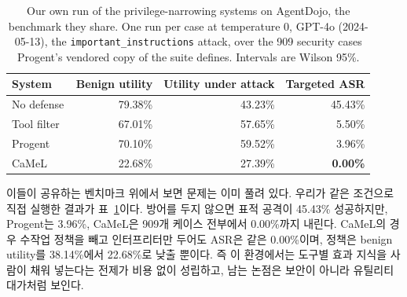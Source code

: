 \documentclass[acmsmall,screen,review,anonymous]{acmart}
\begin{document}
\begin{table}[h]
\caption{Our own run of the privilege-narrowing systems on AgentDojo, the benchmark they share. One run per case at temperature 0, GPT-4o (2024-05-13), the \texttt{important\_instructions} attack, over the 909 security cases Progent's vendored copy of the suite defines. Intervals are Wilson 95\%.}
\label{tab:adrun}
\small
\begin{tabular}{lrrr}
\toprule
System & Benign utility & Utility under attack & Targeted ASR \\
\midrule
No defense                      & 79.38\% & 43.23\% & 45.43\% \\
Tool filter~\cite{debenedetti2024agentdojo} & 67.01\% & 57.65\% & 5.50\% \\
Progent~\cite{shi2025progent}   & 70.10\% & 59.52\% & 3.96\% \\
CaMeL~\cite{debenedetti2025defeating} & 22.68\% & 27.39\% & \textbf{0.00\%} \\
\bottomrule
\end{tabular}
\end{table}

이들이 공유하는 벤치마크 위에서 보면 문제는 이미 풀려 있다. 우리가 같은 조건으로 직접 실행한 결과가 표~\ref{tab:adrun}이다. 방어를 두지 않으면 표적 공격이 45.43\% 성공하지만, Progent는 3.96\%, CaMeL은 909개 케이스 전부에서 0.00\%까지 내린다. CaMeL의 경우 수작업 정책을 빼고 인터프리터만 두어도 ASR은 같은 0.00\%이며, 정책은 benign utility를 38.14\%에서 22.68\%로 낮출 뿐이다. 즉 이 환경에서는 도구별 효과 지식을 사람이 채워 넣는다는 전제가 비용 없이 성립하고, 남는 논점은 보안이 아니라 유틸리티 대가처럼 보인다.
\end{document}
